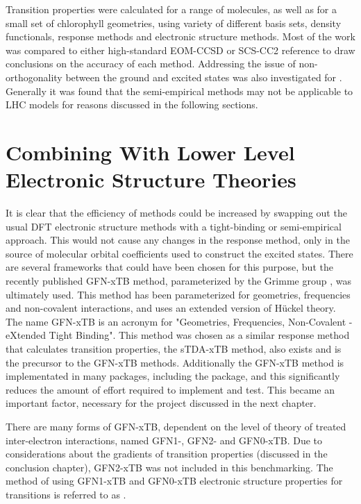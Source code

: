 Transition properties were calculated for a range of molecules, as well as
for a small set of chlorophyll geometries, using variety of different basis sets,
density functionals, response methods and electronic structure methods. Most of 
the work was compared to either high-standard EOM-CCSD or SCS-CC2 reference to
draw conclusions on the accuracy of each method. Addressing the issue of non-orthogonality 
between the ground and excited states was also investigated for \dscf. Generally
it was found that the semi-empirical \dscf methods may not be applicable to LHC
models for reasons discussed in the following sections.

\section{Combining \dscf With Lower Level Electronic Structure Theories}
\label{sec:dscf_theory}
It is clear that the efficiency of \dscf methods could be increased by swapping out
the usual DFT electronic structure methods with a tight-binding or semi-empirical approach.
This would not cause any changes in the response method, only in the source of molecular
orbital coefficients used to construct the excited states. There are several frameworks 
that could have been chosen for this purpose, but the recently published GFN-xTB
method, parameterized by the Grimme group \cite{Grimme2017}, was ultimately used.
This method has been parameterized for geometries, frequencies and non-covalent 
interactions, and uses an extended version of H{\"u}ckel theory. The name GFN-xTB
is an acronym for "Geometries, Frequencies, Non-Covalent - eXtended Tight Binding".
This method was chosen as a similar response method that calculates transition 
properties, the sTDA-xTB method, also exists and is the precursor to the GFN-xTB methods.
Additionally the GFN-xTB method is implementated in many packages, including the
 package, and this significantly reduces the amount of effort required to
implement and test. This became an important factor, necessary for the project 
discussed in the next chapter.

There are many forms of GFN-xTB, dependent on the level of theory of treated inter-electron
interactions, named GFN1-, GFN2- and GFN0-xTB. Due to considerations about the gradients 
of transition properties (discussed in the conclusion chapter), GFN2-xTB was not
included in this benchmarking. The method of using GFN1-xTB and GFN0-xTB electronic 
structure properties for \dscf transitions is referred to as \dxtb.

